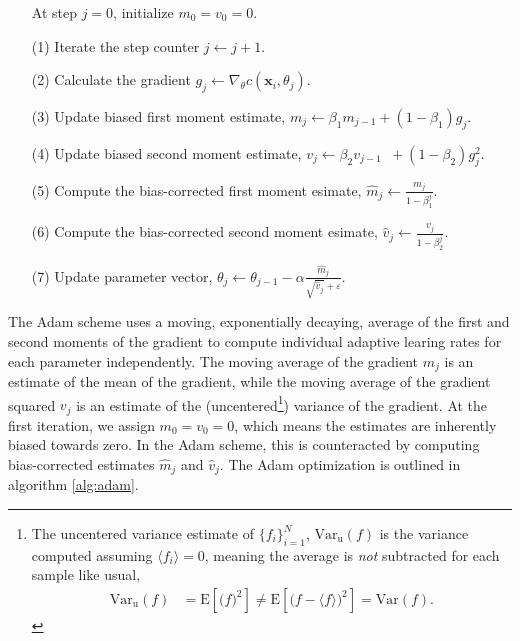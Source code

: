 \documentclass[a4paper, twocolumn]{article}
\begin{document}
\begin{algocf*}
\begin{shadeframe}
\begin{itemize}
  \item[] At step $j=0$, initialize $m_0=v_0=0$.
  \item[(1)] Iterate the step counter $j\leftarrow j+1$.
  \item[(2)] Calculate the gradient $g_j\leftarrow \nabla_\theta c(\mathbf{x}_i,\theta_j)$.
  \item[(3)] Update biased first moment estimate, \phantom{d}  $m_j\leftarrow \beta_1m_{j-1}+(1-\beta_1)g_j$.
  \item[(4)] Update biased second moment estimate, $v_j\leftarrow \beta_2v_{j-1}\phantom{d}+(1-\beta_2)g_j^2$.
  \item[(5)] Compute the bias-corrected first moment esimate, \phantom{d} $\hat m_j\leftarrow \frac{m_j}{1-\beta_1^j}$.
  \item[(6)] Compute the bias-corrected second moment esimate, $\hat v_j  \leftarrow \frac{v_j}{1-\beta_2^j}$.
  \item[(7)] Update parameter vector, $\theta_j\leftarrow \theta_{j-1} - \alpha \frac{\hat m_j}{\sqrt{\hat v_j} + \varepsilon}$.
\end{itemize}
\end{shadeframe}
\end{algocf*}

The Adam scheme uses a moving, exponentially decaying, average of the first and second moments of the gradient to compute individual adaptive learing rates for each parameter independently. The moving average of the gradient $m_j$ is an estimate of the mean of the gradient, while the moving average of the gradient squared $v_j$ is an estimate of the (uncentered\footnote{The uncentered variance estimate of $\{f_i\}_{i=1}^N$, $\text{Var}_\text{u}(f)$ is the variance computed assuming $\langle f_i\rangle =0$, meaning the average is \textit{not} subtracted for each sample like usual,
\begin{align}
\text{Var}_\text{u}(f)&= \text{E}\left[\Big( f \Big)^2\right] \not= \text{E}\left[\Big( f - \langle f\rangle \Big)^2\right] = \text{Var}(f). 
\end{align}}) variance of the gradient. At the first iteration, we assign $m_0=v_0=0$, which means the estimates are inherently biased towards zero. In the Adam scheme, this is counteracted by computing bias-corrected estimates $\hat m_j$ and $\hat v_j$. The Adam optimization is outlined in algorithm \ref{alg:adam}.
\end{document}
